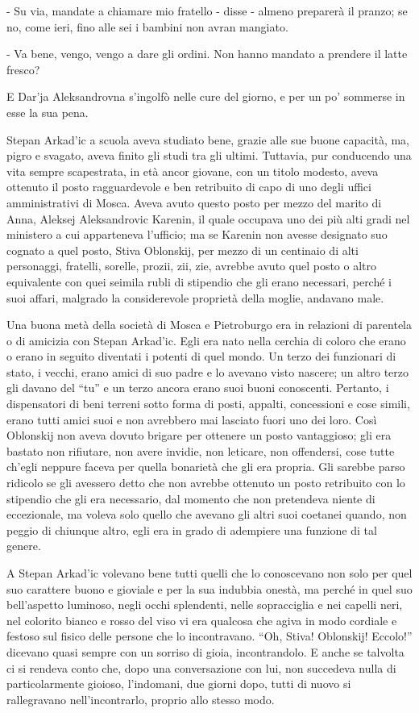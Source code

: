 - Su via, mandate a chiamare mio fratello - disse - almeno preparerà il pranzo; se no, come ieri, fino alle sei i bambini non avran mangiato. 

- Va bene, vengo, vengo a dare gli ordini. Non hanno mandato a prendere il latte fresco? 

E Dar'ja Aleksandrovna s'ingolfò nelle cure del giorno, e per un po' sommerse in esse la sua pena. 

Stepan Arkad'ic a scuola aveva studiato bene, grazie alle sue buone capacità, ma, pigro e svagato, aveva finito gli studi tra gli ultimi. Tuttavia, pur conducendo una vita sempre scapestrata, in età ancor giovane, con un titolo modesto, aveva ottenuto il posto ragguardevole e ben retribuito di capo di uno degli uffici amministrativi di Mosca. Aveva avuto questo posto per mezzo del marito di Anna, Aleksej Aleksandrovic Karenin, il quale occupava uno dei più alti gradi nel ministero a cui apparteneva l'ufficio; ma se Karenin non avesse designato suo cognato a quel posto, Stiva Oblonskij, per mezzo di un centinaio di alti personaggi, fratelli, sorelle, prozii, zii, zie, avrebbe avuto quel posto o altro equivalente con quei seimila rubli di stipendio che gli erano necessari, perché i suoi affari, malgrado la considerevole proprietà della moglie, andavano male. 

Una buona metà della società di Mosca e Pietroburgo era in relazioni di parentela o di amicizia con Stepan Arkad'ic. Egli era nato nella cerchia di coloro che erano o erano in seguito diventati i potenti di quel mondo. Un terzo dei funzionari di stato, i vecchi, erano amici di suo padre e lo avevano visto nascere; un altro terzo gli davano del ``tu'' e un terzo ancora erano suoi buoni conoscenti. Pertanto, i dispensatori di beni terreni sotto forma di posti, appalti, concessioni e cose simili, erano tutti amici suoi e non avrebbero mai lasciato fuori uno dei loro. Così Oblonskij non aveva dovuto brigare per ottenere un posto vantaggioso; gli era bastato non rifiutare, non avere invidie, non leticare, non offendersi, cose tutte ch'egli neppure faceva per quella bonarietà che gli era propria. Gli sarebbe parso ridicolo se gli avessero detto che non avrebbe ottenuto un posto retribuito con lo stipendio che gli era necessario, dal momento che non pretendeva niente di eccezionale, ma voleva solo quello che avevano gli altri suoi coetanei quando, non peggio di chiunque altro, egli era in grado di adempiere una funzione di tal genere. 

A Stepan Arkad'ic volevano bene tutti quelli che lo conoscevano non solo per quel suo carattere buono e gioviale e per la sua indubbia onestà, ma perché in quel suo bell'aspetto luminoso, negli occhi splendenti, nelle sopracciglia e nei capelli neri, nel colorito bianco e rosso del viso vi era qualcosa che agiva in modo cordiale e festoso sul fisico delle persone che lo incontravano. ``Oh, Stiva! Oblonskij! Eccolo!'' dicevano quasi sempre con un sorriso di gioia, incontrandolo. E anche se talvolta ci si rendeva conto che, dopo una conversazione con lui, non succedeva nulla di particolarmente gioioso, l'indomani, due giorni dopo, tutti di nuovo si rallegravano nell'incontrarlo, proprio allo stesso modo. 

